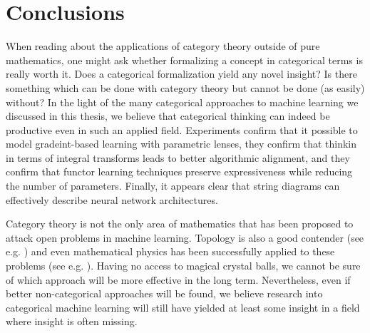 \documentclass[11pt,a4paper,openright,twoside]{report}
\theoremstyle{plain}
\theoremstyle{definition}
\begin{document}

\chapter*{Conclusions}


When reading about the applications of category theory outside of pure mathematics, one might ask whether formalizing a concept in categorical terms is really worth it. Does a categorical formalization yield any novel insight? Is there something which can be done with category theory but cannot be done (as easily) without? In the light of the many categorical approaches to machine learning we discussed in this thesis, we believe that categorical thinking can indeed be productive even in such an applied field. Experiments confirm that it possible to model gradeint-based learning with parametric lenses, they confirm that thinkin in terms of integral transforms leads to better algorithmic alignment, and they confirm that functor learning techniques preserve expressiveness while reducing the number of parameters. Finally, it appears clear that string diagrams can effectively describe neural network architectures.  

Category theory is not the only area of mathematics that has been proposed to attack open problems in machine learning. Topology is also a good contender (see e.g. \cite{hensel2021survey}) and even mathematical physics has been successfully applied to these problems (see e.g. \cite{roberts2022principles}). Having no access to magical crystal balls, we cannot be sure of which approach will be more effective in the long term. Nevertheless, even if better non-categorical approaches will be found, we believe research into categorical machine learning will still have yielded at least some insight in a field where insight is often missing. 
\end{document}
